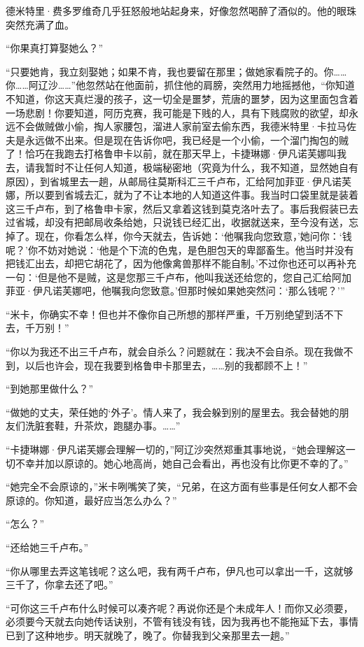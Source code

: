 \par 德米特里·费多罗维奇几乎狂怒般地站起身来，好像忽然喝醉了酒似的。他的眼珠突然充满了血。
\par “你果真打算娶她么？”
\par “只要她肯，我立刻娶她；如果不肯，我也要留在那里；做她家看院子的。你……你……阿辽沙……”他忽然站在他面前，抓住他的肩膀，突然用力地摇撼他，“你知道不知道，你这天真烂漫的孩子，这一切全是噩梦，荒唐的噩梦，因为这里面包含着一场悲剧！你要知道，阿历克赛，我可能是下贱的人，具有下贱腐败的欲望，却永远不会做贼做小偷，掏人家腰包，溜进人家前室去偷东西，我德米特里·卡拉马佐夫是永远做不出来。但是现在告诉你吧，我已经是一个小偷，一个溜门掏包的贼了！恰巧在我跑去打格鲁申卡以前，就在那天早上，卡捷琳娜·伊凡诺芙娜叫我去，请我暂时不让任何人知道，极端秘密地（究竟为什么，我不知道，显然她自有原因），到省城里去一趟，从邮局往莫斯科汇三千卢布，汇给阿加菲亚·伊凡诺芙娜，所以要到省城去汇，就为了不让本地的人知道这件事。我当时口袋里就是装着这三千卢布，到了格鲁申卡家，然后又拿着这钱到莫克洛叶去了。事后我假装已去过省城，却没有把邮局收条给她，只说钱已经汇出，收据就送来，至今没有送，忘掉了。现在，你看怎么样，你今天就去，告诉她：‘他嘱我向您致意，’她问你：‘钱呢？’你不妨对她说：‘他是个下流的色鬼，是色胆包天的卑鄙畜生。他当时并没有把钱汇出去，却把它胡花了，因为他像禽兽那样不能自制。’不过你也还可以再补充一句：‘但是他不是贼，这是您那三千卢布，他叫我送还给您的，您自己汇给阿加菲亚·伊凡诺芙娜吧，他嘱我向您致意。’但那时候如果她突然问：‘那么钱呢？’”
\par “米卡，你确实不幸！但也并不像你自己所想的那样严重，千万别绝望到活不下去，千万别！”
\par “你以为我还不出三千卢布，就会自杀么？问题就在：我决不会自杀。现在我做不到，以后也许会，现在我要到格鲁申卡那里去，……别的我都顾不上！”
\par “到她那里做什么？”
\par “做她的丈夫，荣任她的‘外子’。情人来了，我会躲到别的屋里去。我会替她的朋友们洗脏套鞋，升茶炊，跑腿办事。……”
\par “卡捷琳娜·伊凡诺芙娜会理解一切的，”阿辽沙突然郑重其事地说，“她会理解这一切不幸并加以原谅的。她心地高尚，她自己会看出，再也没有比你更不幸的了。”
\par “她完全不会原谅的，”米卡咧嘴笑了笑，“兄弟，在这方面有些事是任何女人都不会原谅的。你知道，最好应当怎么办么？”
\par “怎么？”
\par “还给她三千卢布。”
\par “你从哪里去弄这笔钱呢？这么吧，我有两千卢布，伊凡也可以拿出一千，这就够三千了，你拿去还了吧。”
\par “可你这三千卢布什么时候可以凑齐呢？再说你还是个未成年人！而你又必须要，必须要今天就去向她传话诀别，不管有钱没有钱，因为我再也不能拖延下去，事情已到了这种地步。明天就晚了，晚了。你替我到父亲那里去一趟。”
